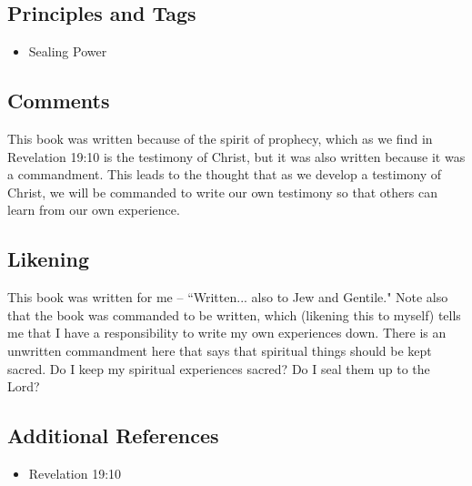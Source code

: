 \documentclass[12pt]{report}
\begin{document}
\subsection{Principles and Tags\label{titlePage:principles2}}
\begin{itemize}
\item {}Sealing Power
\end{itemize}

\subsection{Comments\label{titlePage:comments2}}
This book was written because of the spirit of prophecy, which as we find in Revelation 19:10 is the testimony of Christ, but it was also written because it was a commandment.  This leads to the thought that as we develop a testimony of Christ, we will be commanded to write our own testimony so that others can learn from our own experience.

\subsection{Likening\label{titlePage:likening2}}
This book was written for me -- ``Written... also to Jew and Gentile."  Note also that the book was commanded to be written, which (likening this to myself) tells me that I have a responsibility to write my own experiences down.  There is an unwritten commandment here that says that spiritual things should be kept sacred.  Do I keep my spiritual experiences sacred?  Do I seal them up to the Lord?

\subsection{Additional References\label{titlePage:references2}}
\begin{itemize}
\item Revelation 19:10
\end{itemize}

\end{document}
